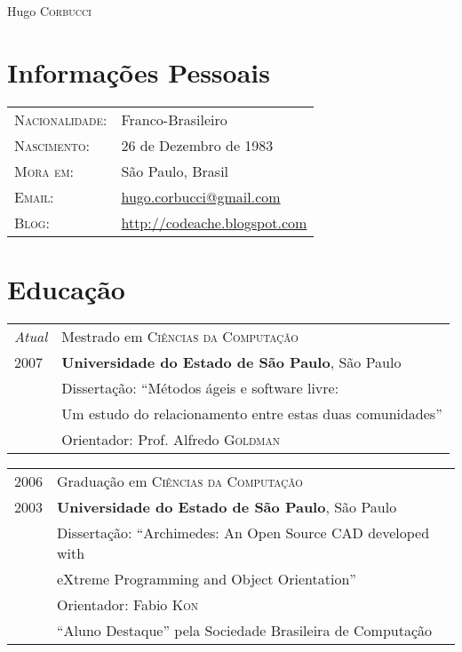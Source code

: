 \documentclass[letter,10pt]{article}
\begin{document}
\par{\centering
		{\Huge Hugo \textsc{Corbucci}
	}\bigskip\par}

\section{Informações Pessoais}

\begin{tabular}{p{2.5cm}l}
    \textsc{Nacionalidade:} & Franco-Brasileiro
    \\
    \textsc{Nascimento:} & 26 de Dezembro de 1983\\
    \textsc{Mora em:}   & São Paulo, Brasil \\
    \textsc{Email:}     &
    \href{mailto:hugo.corbucci@gmail.com}{hugo.corbucci@gmail.com}\\
    \textsc{Blog:}     &
    \href{http://codeache.blogspot.com}{http://codeache.blogspot.com}
\end{tabular}

\section{Educação}
\begin{tabular}{p{2.5cm}l}
  \emph{Atual} & Mestrado em \textsc{Ciências da Computação}\\
  \textsc{2007} & \textbf{Universidade do Estado de São Paulo}, São Paulo\\
  & Dissertação: ``Métodos ágeis e software livre:\\
  & Um estudo do relacionamento entre estas duas comunidades''\\
  & \small Orientador: Prof. Alfredo \textsc{Goldman}\\
\end{tabular}

\begin{tabular}{p{2.5cm}l}
  \textsc{2006} & Graduação em \textsc{Ciências da Computação}\\
  \textsc{2003} &\normalsize\textbf{Universidade do Estado de São Paulo}, São Paulo\\
  & Dissertação: ``Archimedes: An Open Source CAD developed with\\
  & eXtreme Programming and Object Orientation''\\
  & \small Orientador: Fabio \textsc{Kon}\\
  & ``Aluno Destaque'' pela Sociedade Brasileira de Computação\\
\end{tabular}
\end{document}
